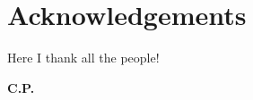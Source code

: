 \thispagestyle{empty}
\section*{Acknowledgements}
Here I thank all the people!
\begin{flushright}
\textbf{C.P.} %
\end{flushright}


